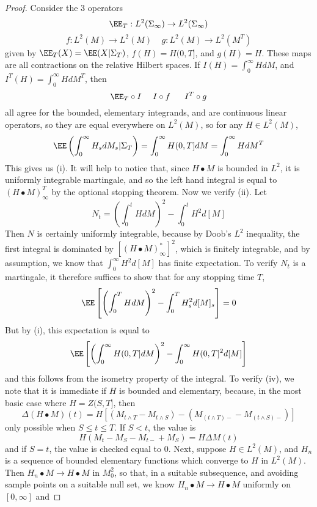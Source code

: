 \begin{proof}
    Consider the 3 operators
    \[ \EE_T: L^2(\Sigma_\infty) \to L^2(\Sigma_\infty) \]
    \[ f: L^2(M) \to L^2(M)\ \ \ \ \ g: L^2(M) \to L^2(M^T) \]
    given by $\EE_T(X) = \EE(X|\Sigma_T)$, $f(H) = H(0,T]$, and $g(H) = H$. These maps are all contractions on the relative Hilbert spaces. If $I(H) = \int_0^\infty H dM$, and $I^T(H) = \int_0^\infty H dM^T$, then
    \[ \EE_T \circ I\ \ \ \ I \circ f\ \ \ \ \ I^T \circ g \]
    all agree for the bounded, elementary integrands, and are continuous linear operators, so they are equal everywhere on $L^2(M)$, so for any $H \in L^2(M)$,
    \[ \EE \left( \int_0^\infty H_s dM_s | \Sigma_T \right) = \int_0^\infty H(0,T] dM = \int_0^\infty H dM^T \]
    This gives us (i). It will help to notice that, since $H \bullet M$ is bounded in $L^2$, it is uniformly integrable martingale, and so the left hand integral is equal to $(H \bullet M)^T_\infty$ by the optional stopping theorem. Now we verify (ii). Let
    \[ N_t = \left( \int_0^t H dM \right)^2 - \int_0^t H^2 d[M] \]
    Then $N$ is certainly uniformly integrable, because by Doob's $L^2$ inequality, the first integral is dominated by $[(H \bullet M)_\infty^*]^2$, which is finitely integrable, and by assumption, we know that $\int_0^\infty H^2 d[M]$ has finite expectation. To verify $N_t$ is a martingale, it therefore suffices to show that for any stopping time $T$,
    \[ \EE \left[ \left( \int_0^T H dM \right)^2 - \int_0^T H_s^2 d[M]_s \right] = 0 \]
    But by (i), this expectation is equal to
    \[ \EE \left[ \left( \int_0^\infty H(0,T] dM \right)^2 - \int_0^\infty H(0,T]^2 d[M] \right] \]
    and this follows from the isometry property of the integral. To verify (iv), we note that it is immediate if $H$ is bounded and elementary, because, in the most basic case where $H = Z(S,T]$, then
    \[\Delta (H \bullet M)(t) = H \left[ \left( M_{t \wedge T} - M_{t \wedge S} \right) - \left( M_{(t \wedge T)-} - M_{(t \wedge S)-} \right) \right] \]
    only possible when $S \leq t \leq T$. If $S < t$, the value is
    \[ H ( M_t - M_S - M_{t-} + M_S ) = H \Delta M(t) \]
    and if $S = t$, the value is checked equal to 0. Next, suppose $H \in L^2(M)$, and $H_n$ is a sequence of bounded elementary functions which converge to $H$ in $L^2(M)$. Then $H_n \bullet M \to H \bullet M$ in $M^2_0$, so that, in a suitable subsequence, and avoiding sample points on a suitable null set, we know $H_n \bullet M \to H \bullet M$ uniformly on $[0,\infty]$ and

\end{proof}
